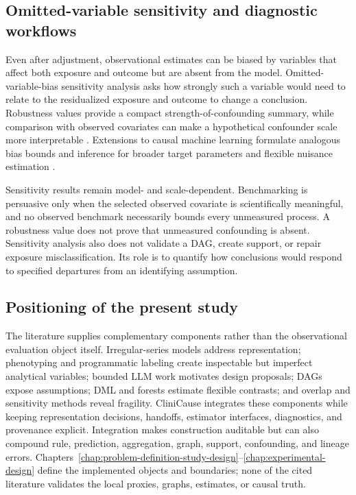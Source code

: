 \subsection{Omitted-variable sensitivity and diagnostic workflows}

Even after adjustment, observational estimates can be biased by variables that affect both exposure and outcome but are absent from the model.  Omitted-variable-bias sensitivity analysis asks how strongly such a variable would need to relate to the residualized exposure and outcome to change a conclusion.  Robustness values provide a compact strength-of-confounding summary, while comparison with observed covariates can make a hypothetical confounder scale more interpretable \cite{cinelli_hazlett_2020_sensitivity}.  Extensions to causal machine learning formulate analogous bias bounds and inference for broader target parameters and flexible nuisance estimation \cite{chernozhukov_et_al_2026_ovb_causal_ml}.

Sensitivity results remain model- and scale-dependent.  Benchmarking is persuasive only when the selected observed covariate is scientifically meaningful, and no observed benchmark necessarily bounds every unmeasured process.  A robustness value does not prove that unmeasured confounding is absent.  Sensitivity analysis also does not validate a DAG, create support, or repair exposure misclassification.  Its role is to quantify how conclusions would respond to specified departures from an identifying assumption.

\subsection{Positioning of the present study}

The literature supplies complementary components rather than the observational evaluation object itself.  Irregular-series models address representation; phenotyping and programmatic labeling create inspectable but imperfect analytical variables; bounded LLM work motivates design proposals; DAGs expose assumptions; DML and forests estimate flexible contrasts; and overlap and sensitivity methods reveal fragility.  CliniCause integrates these components while keeping representation decisions, handoffs, estimator interfaces, diagnostics, and provenance explicit.  Integration makes construction auditable but can also compound rule, prediction, aggregation, graph, support, confounding, and lineage errors.  Chapters~\ref{chap:problem-definition-study-design}--\ref{chap:experimental-design} define the implemented objects and boundaries; none of the cited literature validates the local proxies, graphs, estimates, or causal truth.
